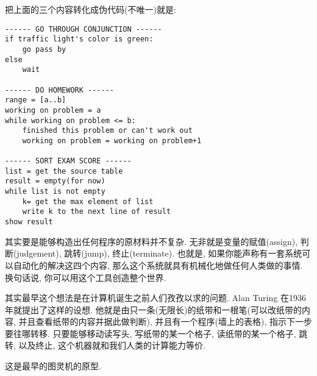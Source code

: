 把上面的三个内容转化成伪代码(不唯一)就是:
\begin{verbatim}
------ GO THROUGH CONJUNCTION ------
if traffic light's color is green:
    go pass by
else
    wait

------ DO HOMEWORK ------
range = [a..b]
working on problem = a
while working on problem <= b:
    finished this problem or can't work out
    working on problem = working on problem+1

------ SORT EXAM SCORE ------
list = get the source table
result = empty(for now)
while list is not empty
    k= get the max element of list
    write k to the next line of result
show result
\end{verbatim}
其实要是能够构造出任何程序的原材料并不复杂. 无非就是变量的赋值(assign), 判断(judgement), 跳转(jump), 终止(terminate). 也就是, 如果你能声称有一套系统可以自动化的解决这四个内容,
那么这个系统就具有机械化地做任何人类做的事情. 换句话说, 你可以用这个工具创造整个世界. 

其实最早这个想法是在计算机诞生之前人们孜孜以求的问题. Alan Turing 在1936年就提出了这样的设想. 他就是由只一条(无限长)的纸带和一根笔(可以改纸带的内容,
并且查看纸带的内容并据此做判断), 并且有一个程序(墙上的表格), 指示下一步要往哪转移. 只要能够移动读写头, 写纸带的某一个格子,
读纸带的某一个格子, 跳转, 以及终止, 这个机器就和我们人类的计算能力等价. 

这是最早的图灵机的原型. 


